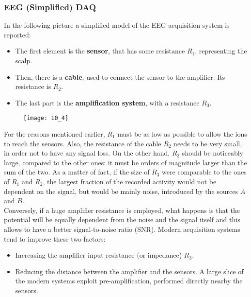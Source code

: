 \subsubsection{EEG (Simplified) DAQ}
In the following picture a simplified model of the EEG acquisition system is reported:
\begin{itemize}
    \item The first element is the \textbf{sensor}, that has some resistance
          \(R_1\), representing the scalp.
    \item Then, there is a \textbf{cable}, used to connect the sensor to the amplifier.
          Its resistance is \(R_2\).
    \item The last part is the \textbf{amplification system}, with a resistance \(R_3\).
\end{itemize}
\begin{figure}[H]
    \texttt{[image: 10\_4]}
    \centering
\end{figure}
For the reasons mentioned earlier, \(R_1\) must be as low as possible to allow the ions to
reach the sensors. Also, the resistance of the cable \(R_2\) needs to be very small, in
order not to have any signal loss. On the other hand, \(R_3\) should be noticeably
large, compared to the other ones: it must be orders of magnitude larger than the sum of
the two. As a matter of fact, if the size of \(R_3\) were comparable to the ones of
\(R_1\) and \(R_2\), the largest fraction of the recorded activity would not be dependent on
the signal, but would be mainly noise, introduced by the sources \(A\) and \(B\).\\
Conversely, if a huge amplifier resistance is employed, what happens is that the potential
will be equally dependent from the noise and the signal itself and this allows to have a
better signal-to-noise ratio (SNR). Modern acquisition systems tend to improve these two
factors:
\begin{itemize}
    \item Increasing the amplifier input resistance (or impedance) \(R_3\).
    \item Reducing the distance between the amplifier and the sensors. A large slice of the
    modern systems exploit pre-amplification, performed directly nearby the sensors.
\end{itemize}
